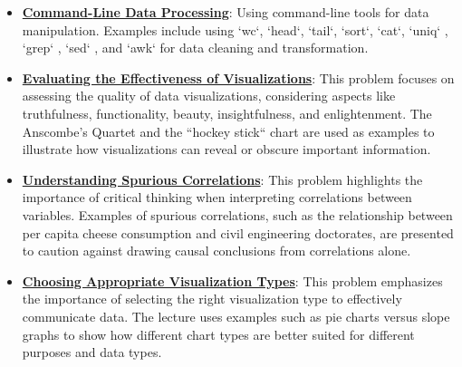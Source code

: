 \documentclass{article}%
\begin{document}
\begin{itemize}[leftmargin=*]
\item \href{https://purdue.brightspace.com/d2l/common/assets/pdfjs-d2l-dist/1.0.14-legacy/web/viewer.html?file=\%2Fcontent\%2Fenforced\%2F1095465-WL.202510.CS24200.LE1\%2F06L3-wrangling.pdf\%3Fou\%3D1095465\&lang=en-us\&container=d2l-fileviewer-rendered-pdf\&fullscreen=d2l-fileviewer-rendered-pdf-dialog\&height=667#page=81}{\textbf{Command{-}Line Data Processing}}: Using command-line tools for data manipulation. Examples include using `wc`, `head`, `tail`, `sort`, `cat`, `uniq` , `grep` , `sed` , and `awk`  for data cleaning and transformation.%
\end{itemize}%
\begin{itemize}[leftmargin=*]%
\item \href{https://purdue.brightspace.com/d2l/common/assets/pdfjs-d2l-dist/1.0.14-legacy/web/viewer.html?file=\%2Fcontent\%2Fenforced\%2F1095465-WL.202510.CS24200.LE1\%2F09L1-IntroToVis.pdf\%3Fou\%3D1095465\&lang=en-us\&container=d2l-fileviewer-rendered-pdf\&fullscreen=d2l-fileviewer-rendered-pdf-dialog\&height=667#page=3}{\textbf{Evaluating the Effectiveness of Visualizations}}: This problem focuses on assessing the quality of data visualizations, considering aspects like truthfulness, functionality, beauty, insightfulness, and enlightenment. The Anscombe's Quartet and the ``hockey stick`` chart are used as examples to illustrate how visualizations can reveal or obscure important information.%
\item \href{https://purdue.brightspace.com/d2l/common/assets/pdfjs-d2l-dist/1.0.14-legacy/web/viewer.html?file=\%2Fcontent\%2Fenforced\%2F1095465-WL.202510.CS24200.LE1\%2F09L1-IntroToVis.pdf\%3Fou\%3D1095465\&lang=en-us\&container=d2l-fileviewer-rendered-pdf\&fullscreen=d2l-fileviewer-rendered-pdf-dialog\&height=667#page=20}{\textbf{Understanding Spurious Correlations}}: This problem highlights the importance of critical thinking when interpreting correlations between variables. Examples of spurious correlations, such as the relationship between per capita cheese consumption and civil engineering doctorates, are presented to caution against drawing causal conclusions from correlations alone.%
\item \href{https://purdue.brightspace.com/d2l/common/assets/pdfjs-d2l-dist/1.0.14-legacy/web/viewer.html?file=\%2Fcontent\%2Fenforced\%2F1095465-WL.202510.CS24200.LE1\%2F09L1-IntroToVis.pdf\%3Fou\%3D1095465\&lang=en-us\&container=d2l-fileviewer-rendered-pdf\&fullscreen=d2l-fileviewer-rendered-pdf-dialog\&height=667#page=5}{\textbf{Choosing Appropriate Visualization Types}}: This problem emphasizes the importance of selecting the right visualization type to effectively communicate data. The lecture uses examples such as pie charts versus slope graphs to show how different chart types are better suited for different purposes and data types.%

\end{itemize}
\end{document}
